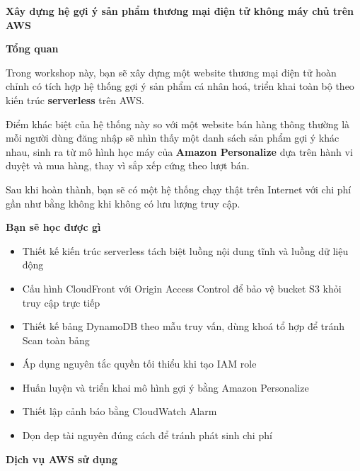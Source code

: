 \vspace{0.5em}\noindent\textbf{Xây dựng hệ gợi ý sản phẩm thương mại điện tử không máy chủ
trên
AWS}\par

\vspace{0.5em}\noindent\textbf{Tổng quan}\par

Trong workshop này, bạn sẽ xây dựng một website thương mại điện tử hoàn
chỉnh có tích hợp hệ thống gợi ý sản phẩm cá nhân hoá, triển khai toàn
bộ theo kiến trúc \textbf{serverless} trên AWS.

Điểm khác biệt của hệ thống này so với một website bán hàng thông thường
là mỗi người dùng đăng nhập sẽ nhìn thấy một danh sách sản phẩm gợi ý
khác nhau, sinh ra từ mô hình học máy của \textbf{Amazon Personalize}
dựa trên hành vi duyệt và mua hàng, thay vì sắp xếp cứng theo lượt bán.

Sau khi hoàn thành, bạn sẽ có một hệ thống chạy thật trên Internet với
chi phí gần như bằng không khi không có lưu lượng truy cập.

\vspace{0.5em}\noindent\textbf{Bạn sẽ học được
gì}\par

\begin{itemize}
\tightlist
\item
  Thiết kế kiến trúc serverless tách biệt luồng nội dung tĩnh và luồng
  dữ liệu động
\item
  Cấu hình CloudFront với Origin Access Control để bảo vệ bucket S3 khỏi
  truy cập trực tiếp
\item
  Thiết kế bảng DynamoDB theo mẫu truy vấn, dùng khoá tổ hợp để tránh
  Scan toàn bảng
\item
  Áp dụng nguyên tắc quyền tối thiểu khi tạo IAM role
\item
  Huấn luyện và triển khai mô hình gợi ý bằng Amazon Personalize
\item
  Thiết lập cảnh báo bằng CloudWatch Alarm
\item
  Dọn dẹp tài nguyên đúng cách để tránh phát sinh chi phí
\end{itemize}

\vspace{0.5em}\noindent\textbf{Dịch vụ AWS sử
dụng}\par


